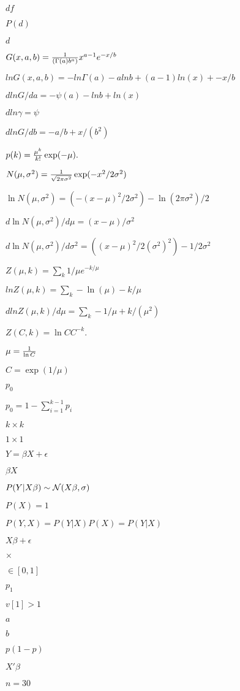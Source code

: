 \documentclass{article}
\begin{document}
$df$
\pagebreak

$P(d)$
\pagebreak

$d$
\pagebreak

$G(x, a, b) = {1\over (\Gamma(a) b^a)} x^{a-1} e^{-x/b}$
\pagebreak

$ln G(x, a, b)= -ln \Gamma(a) - a ln b + (a-1)ln(x) + -x/b$
\pagebreak

$d ln G/ da = -\psi(a) - ln b + ln(x) $
\pagebreak

$d ln \gamma = \psi$
\pagebreak

$d ln G/ db = -a/b + x/(b^2) $
\pagebreak

$p(k) = {\mu^k \over k!} \exp(-\mu). $
\pagebreak

$N(\mu,\sigma^2) = {1 \over \sqrt{2 \pi \sigma^2}} \exp (-x^2 / 2\sigma^2)$
\pagebreak

$\ln N(\mu,\sigma^2) = (-(x-\mu)^2 / 2\sigma^2) - \ln (2 \pi \sigma^2)/2 $
\pagebreak

$d\ln N(\mu,\sigma^2)/d\mu = (x-\mu) / \sigma^2 $
\pagebreak

$d\ln N(\mu,\sigma^2)/d\sigma^2 = ((x-\mu)^2 / 2(\sigma^2)^2) - 1/2\sigma^2 $
\pagebreak

$Z(\mu,k) = \sum_k 1/\mu e^{-k/\mu} $
\pagebreak

$ln Z(\mu,k) = \sum_k -\ln(\mu) - k/\mu $
\pagebreak

$dln Z(\mu,k)/d\mu = \sum_k -1/\mu + k/(\mu^2) $
\pagebreak

$Z(C,k) = \ln C C^{-k}. $
\pagebreak

$\mu = {1\over \ln C}$
\pagebreak

$C=\exp(1/\mu)$
\pagebreak

$p_0$
\pagebreak

$p_0=1-\sum_{i=1}^{k-1} p_i$
\pagebreak

$k \times k$
\pagebreak

$1\times 1$
\pagebreak

$ Y = \beta X + \epsilon$
\pagebreak

$\beta X$
\pagebreak

$P(Y|X\beta) \sim {\cal N}(X\beta, \sigma)$
\pagebreak

$P(X)=1$
\pagebreak

$P(Y, X) = P(Y|X)P(X) = P(Y|X)$
\pagebreak

$X\beta+\epsilon$
\pagebreak

$\times$
\pagebreak

$\in[0,1]$
\pagebreak

$p_1$
\pagebreak

$v[1]>1$
\pagebreak

$a$
\pagebreak

$b$
\pagebreak

$p(1-p)$
\pagebreak

$X'\beta$
\pagebreak

$n=30$
\pagebreak
\end{document}
